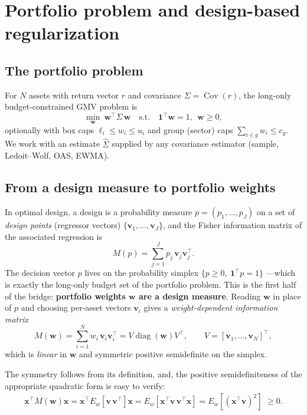 \documentclass[11pt]{article}
\newcommand{\Sig}{\Sigma}
\newcommand{\Sighat}{\hat\Sigma}
\newcommand{\diag}{\operatorname{diag}}
\newcommand{\one}{\mathbf{1}}
\newcommand{\w}{\mathbf{w}}
\newcommand{\vv}{\mathbf{v}}
\newcommand{\M}{M(\w)}
\begin{document}
\section{Portfolio problem and design-based regularization}
\label{sec:setup}
\subsection{The portfolio problem}
For $N$ assets with return vector $r$ and covariance $\Sig=\operatorname{Cov}(r)$,
the long-only budget-constrained GMV problem is
\[
  \min_{\w}\ \w^\top\Sig\,\w
  \quad\text{s.t.}\quad \one^\top\w=1,\ \ \w\ge0,
\]
optionally with box caps $\ell_i\le w_i\le u_i$ and group (sector) caps
$\sum_{i\in g}w_i\le c_g$. We work with an estimate $\Sighat$ supplied by any
covariance estimator (sample, Ledoit--Wolf, OAS, EWMA).

\subsection{From a design measure to portfolio weights}
In optimal design, a design is a probability measure $p=(p_1,\dots,p_J)$ on a set
of \emph{design points} (regressor vectors) $\{\vv_1,\dots,\vv_J\}$, and the
Fisher information matrix of the associated regression is
\[
  M(p)=\sum_{j=1}^{J}p_j\,\vv_j\vv_j^\top .
\]
The decision vector $p$ lives on the probability simplex $\{p\ge0,\ \one^\top p=1\}$
---which is exactly the long-only budget set of the portfolio problem. This is the
first half of the bridge: \textbf{portfolio weights $\w$ are a design measure}.
Reading $\w$ in place of $p$ and choosing per-asset vectors $\vv_i$ gives a
\emph{weight-dependent information matrix}
\begin{equation}
  \M=\sum_{i=1}^{N} w_i\,\vv_i\vv_i^\top=V\diag(\w)V^\top,
  \qquad V=[\vv_1,\dots,\vv_N]^\top ,
  \label{eq:infomat}
\end{equation}
which is \emph{linear} in $\w$ and symmetric positive semidefinite on the simplex.

The symmetry follows from its definition, and, the positive semidefiniteness
of the appropriate quadratic form is easy to verify:
\begin{eqnarray*}
\mathbf{x}^{\top} \M \mathbf{x}
= \mathbf{x}^{\top}E_{w}[\mathbf{v}\,\mathbf{v}^{\top}]\mathbf{x}
= E_{w}[\mathbf{x}^{\top}\mathbf{v}\,\mathbf{v}^{\top}\mathbf{x}]
= E_{w}[(\mathbf{x}^{\top}\mathbf{v})^{2}] \,\, \geq 0. \nonumber
\end{eqnarray*}
\end{document}
